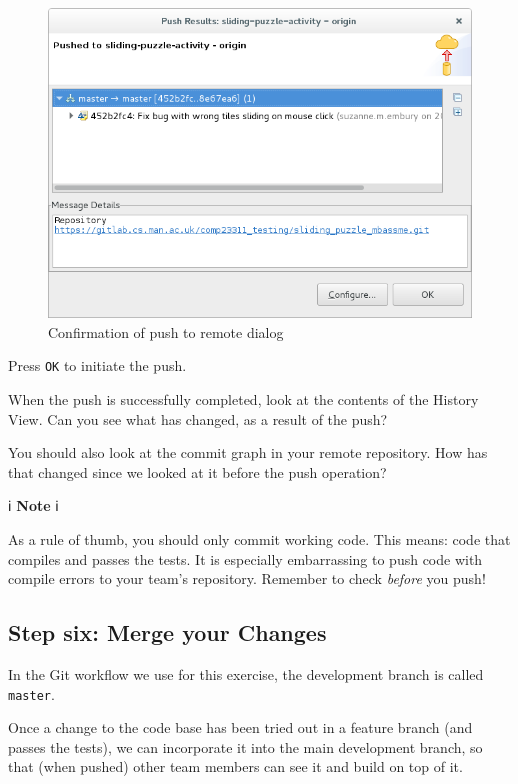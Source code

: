 \documentclass[
]{book}
\begin{document}
\begin{figure}

{\centering \includegraphics[width=1\linewidth]{images/confirmationOfPushToRemote} 

}

\caption{Confirmation of push to remote dialog}\label{fig:confirmationOfPushToRemote-fig}
\end{figure}

Press \texttt{OK} to initiate the push.

When the push is successfully completed, look at the contents of the History View. Can you see what has changed, as a result of the push?

You should also look at the commit graph in your remote repository. How has that changed since we looked at it before the push operation?

ℹ️ \textbf{Note} ℹ️

As a rule of thumb, you should only commit working code. This means: code that compiles and passes the tests. It is especially embarrassing to push code with compile errors to your team's repository. Remember to check \emph{before} you push!

\hypertarget{mergechanges}{%
\subsection{Step six: Merge your Changes}\label{mergechanges}}

In the Git workflow we use for this exercise, the development branch is called \texttt{master}.

Once a change to the code base has been tried out in a feature branch (and passes the tests), we can incorporate it into the main development branch, so that (when pushed) other team members can see it and build on top of it.
\end{document}
